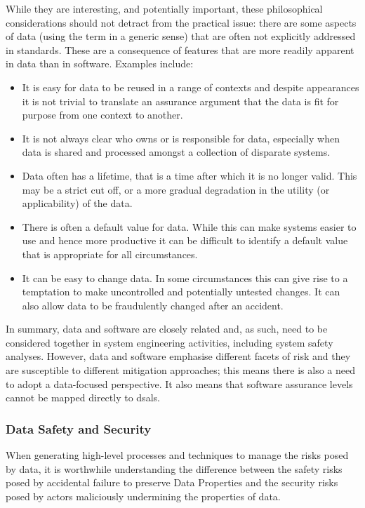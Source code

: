 While they are interesting, and potentially important, these philosophical considerations should not detract from the practical issue: there are some aspects of data (using the term in a generic sense) that are often not explicitly addressed in standards. These are a consequence of features that are more readily apparent in data than in software. Examples include:
\begin{itemize}
  \item It is easy for data to be reused in a range of contexts and despite appearances it is not trivial to translate an assurance argument that the data is fit for purpose from one context to another.
  \item It is not always clear who owns or is responsible for data, especially when data is shared and processed amongst a collection of disparate systems.
	\item Data often has a \gls{lifetime}, that is a time after which it is no longer valid. This may be a strict cut off, or a more gradual degradation in the utility (or applicability) of the data.
  \item There is often a default value for data. While this can make systems easier to use and hence more productive it can be difficult to identify a default value that is appropriate for all circumstances.
  \item It can be easy to change data. In some circumstances this can give rise to a temptation to make uncontrolled and potentially untested changes. It can also allow data to be fraudulently changed after an accident.
\end{itemize}
In summary, data and software are closely related and, as such, need to be considered together in system engineering activities, including system safety analyses. However, data and software emphasise different facets of risk and they are susceptible to different mitigation approaches; this means there is also a need to adopt a data-focused perspective. It also means that \glspl{software assurance level} cannot be mapped directly to \glspl{dsal}.

\subsubsection{Data Safety and Security}
When generating high-level processes and techniques to manage the risks posed by data, it is worthwhile understanding the difference between the safety risks posed by accidental failure to preserve Data Properties and the security risks posed by actors maliciously undermining the properties of data.

